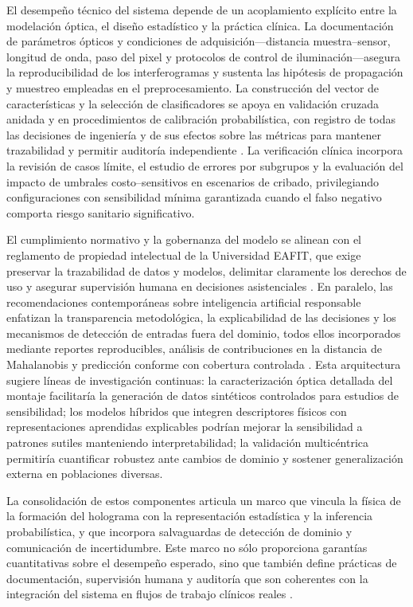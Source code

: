 El desempeño técnico del sistema depende de un acoplamiento explícito entre la modelación óptica, el diseño estadístico y la práctica clínica. La documentación de parámetros ópticos y condiciones de adquisición—distancia muestra–sensor, longitud de onda, paso del pixel y protocolos de control de iluminación—asegura la reproducibilidad de los interferogramas y sustenta las hipótesis de propagación y muestreo empleadas en el preprocesamiento. La construcción del vector de características y la selección de clasificadores se apoya en validación cruzada anidada y en procedimientos de calibración probabilística, con registro de todas las decisiones de ingeniería y de sus efectos sobre las métricas para mantener trazabilidad y permitir auditoría independiente \cite{Tsamardinos2022,Vabalas2019,Pedregosa2011}. La verificación clínica incorpora la revisión de casos límite, el estudio de errores por subgrupos y la evaluación del impacto de umbrales costo–sensitivos en escenarios de cribado, privilegiando configuraciones con sensibilidad mínima garantizada cuando el falso negativo comporta riesgo sanitario significativo.

El cumplimiento normativo y la gobernanza del modelo se alinean con el reglamento de propiedad intelectual de la Universidad EAFIT, que exige preservar la trazabilidad de datos y modelos, delimitar claramente los derechos de uso y asegurar supervisión humana en decisiones asistenciales \cite{EAFIT2018}. En paralelo, las recomendaciones contemporáneas sobre inteligencia artificial responsable enfatizan la transparencia metodológica, la explicabilidad de las decisiones y los mecanismos de detección de entradas fuera del dominio, todos ellos incorporados mediante reportes reproducibles, análisis de contribuciones en la distancia de Mahalanobis y predicción conforme con cobertura controlada \cite{Montero2024}. Esta arquitectura sugiere líneas de investigación continuas: la caracterización óptica detallada del montaje facilitaría la generación de datos sintéticos controlados para estudios de sensibilidad; los modelos híbridos que integren descriptores físicos con representaciones aprendidas explicables podrían mejorar la sensibilidad a patrones sutiles manteniendo interpretabilidad; la validación multicéntrica permitiría cuantificar robustez ante cambios de dominio y sostener generalización externa en poblaciones diversas.

La consolidación de estos componentes articula un marco que vincula la física de la formación del holograma con la representación estadística y la inferencia probabilística, y que incorpora salvaguardas de detección de dominio y comunicación de incertidumbre. Este marco no sólo proporciona garantías cuantitativas sobre el desempeño esperado, sino que también define prácticas de documentación, supervisión humana y auditoría que son coherentes con la integración del sistema en flujos de trabajo clínicos reales \cite{EAFIT2018,Montero2024}.
